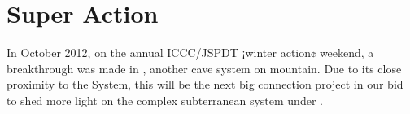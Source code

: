 \section{Super Action}


In October 2012, on the annual ICCC/JSPDT ¡winter action¢ weekend, a
breakthrough was made in , another cave system on
mountain. Due to its close proximity to the System, this will be the
next big connection project in our bid to shed more light on the complex
subterranean system under .

